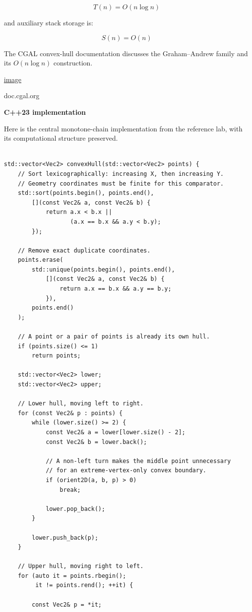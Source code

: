 \[
\boxed{T(n)=O(n\log n)}
\]

and auxiliary stack storage is:

\[
\boxed{S(n)=O(n)}
\]

The CGAL convex-hull documentation discusses the Graham--Andrew family and its \(O(n\log n)\) construction. 

\href{https://www.google.com/s2/favicons?domain=https://doc.cgal.org&sz=32}{image}

doc.cgal.org

\textbf{C++23 implementation}

Here is the central monotone-chain implementation from the reference lab, with its computational structure preserved.

\begin{verbatim}

std::vector<Vec2> convexHull(std::vector<Vec2> points) {
    // Sort lexicographically: increasing X, then increasing Y.
    // Geometry coordinates must be finite for this comparator.
    std::sort(points.begin(), points.end(),
        [](const Vec2& a, const Vec2& b) {
            return a.x < b.x ||
                   (a.x == b.x && a.y < b.y);
        });

    // Remove exact duplicate coordinates.
    points.erase(
        std::unique(points.begin(), points.end(),
            [](const Vec2& a, const Vec2& b) {
                return a.x == b.x && a.y == b.y;
            }),
        points.end()
    );

    // A point or a pair of points is already its own hull.
    if (points.size() <= 1)
        return points;

    std::vector<Vec2> lower;
    std::vector<Vec2> upper;

    // Lower hull, moving left to right.
    for (const Vec2& p : points) {
        while (lower.size() >= 2) {
            const Vec2& a = lower[lower.size() - 2];
            const Vec2& b = lower.back();

            // A non-left turn makes the middle point unnecessary
            // for an extreme-vertex-only convex boundary.
            if (orient2D(a, b, p) > 0)
                break;

            lower.pop_back();
        }

        lower.push_back(p);
    }

    // Upper hull, moving right to left.
    for (auto it = points.rbegin();
         it != points.rend(); ++it) {

        const Vec2& p = *it;


\end{verbatim}
